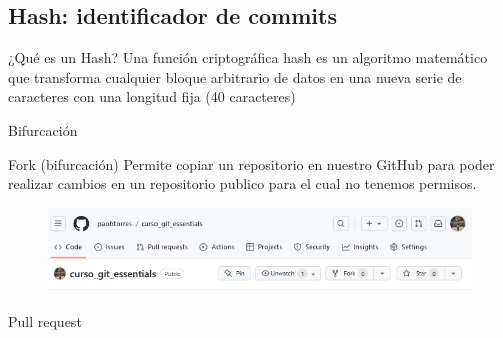\documentclass{beamer}
\begin{document}
\subsection{Hash: identificador de commits}

\begin{frame}

  \begin{alertblock}{¿Qué es un Hash?}
    Una función criptográfica hash es un algoritmo matemático que transforma cualquier bloque arbitrario de datos en una nueva serie de caracteres con una longitud fija (40 caracteres)
    \end{alertblock}  




\end{frame}


\begin{frame}{Bifurcación }

    \begin{block}{Fork (bifurcación)}
      Permite copiar un repositorio en nuestro GitHub para poder realizar cambios en un repositorio publico para el cual no tenemos permisos.
      \begin{figure}
        \includegraphics[width=\textwidth]{images/git-fork.PNG}
      \end{figure}
    \end{block}

  \end{frame}

  \begin{frame}{Pull request}


  \end{frame}
\end{document}

